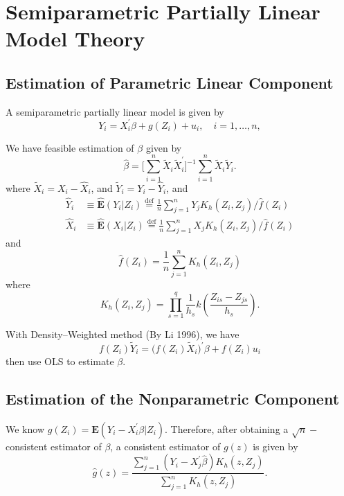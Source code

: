 \documentclass{article}
\newcommand*{\defeq}{\stackrel{\text{def}}{=}}
\begin{document}
\section{Semiparametric Partially Linear Model Theory}
\subsection{Estimation of Parametric Linear Component}
A semiparametric partially linear model is given by
\begin{equation}
Y_{i} = X_{i}^{\prime}\beta + g(Z_{i}) + u_{i},\quad i = 1,\ldots,n,
\end{equation}

We have feasible estimation of $\beta$ given by
\begin{equation}
\hat{\beta} = \Big[\sum_{i=1}^{n}\tilde{X}_{i}\tilde{X}_{i}^{\prime}\Big]^{-1}\sum_{i=1}^{n}\tilde{X}_{i}\tilde{Y}_{i}.
\end{equation}
where $\tilde{X}_{i}=X_{i}-\hat{X}_{i}$, and $\tilde{Y}_{i}=Y_{i}-\hat{Y}_{i}$, and
\begin{align}
\hat{Y}_{i} &\equiv \hat{\mathbf{E}}(Y_{i}| Z_{i})\defeq\frac{1}{n}\sum_{j=1}^{n}Y_{j}K_{h}(Z_{i},Z_{j})/\hat{f}(Z_{i})\\
\hat{X}_{i} &\equiv \hat{\mathbf{E}}(X_{i}| Z_{i})\defeq\frac{1}{n}\sum_{j=1}^{n}X_{j}K_{h}(Z_{i},Z_{j})/\hat{f}(Z_{i})
\end{align}
and
\begin{equation}
\hat{f}(Z_{i}) = \frac{1}{n}\sum_{j=1}^{n} K_{h}(Z_{i},Z_{j})
\end{equation}
where
\begin{equation}
K_{h}(Z_{i},Z_{j}) = \prod_{s=1}^{q} \frac{1}{h_{s}}k(\frac{Z_{is}-Z_{js}}{h_{s}}). \label{Kh}
\end{equation}

With Density--Weighted method (By Li 1996), we have
\begin{equation}
    f(Z_{i})\tilde{Y}_{i}  = \big(f(Z_{i})\tilde{X}_{i}\big)^{\prime}\beta + f(Z_{i})u_{i}
\end{equation}
then use OLS to estimate $\beta$.

\subsection{Estimation of the Nonparametric Component}
We know $g(Z_{i})=\mathbf{E}(Y_{i}-X_{i}^{\prime}\beta|Z_{i})$. Therefore, after obtaining a $\sqrt{n}-$ consistent estimator of $\beta$, a consistent estimator of $g(z)$ is given by
\begin{equation}
\hat{g}(z) = \frac{\sum_{j=1}^{n}(Y_{i}-X_{j}^{\prime}\hat{\beta})K_{h}(z,Z_{j})}{\sum_{j=1}^{n}K_{h}(z,Z_{j})}. \label{nonparametric component}
\end{equation}
\end{document}
